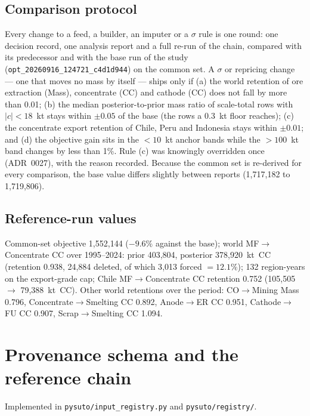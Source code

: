 \documentclass[11pt]{article}
\begin{document}
\subsection{Comparison protocol}
Every change to a feed, a builder, an imputer or a $\sigma$ rule is one
round: one decision record, one analysis report and a full re-run of the
chain, compared with its predecessor and with the base run of the study
(\texttt{opt\_20260916\_124721\_c4d1d944}) on the common set. A $\sigma$ or
repricing change --- one that moves no mass by itself --- ships only if
(a) the world retention of ore extraction (Mass), concentrate (CC) and
cathode (CC) does not fall by more than 0.01; (b) the median
posterior-to-prior mass ratio of scale-total rows with $|c| < 18$~kt stays
within $\pm 0.05$ of the base (the rows a 0.3~kt floor reaches); (c) the
concentrate export retention of Chile, Peru and Indonesia stays within
$\pm 0.01$; and (d) the objective gain sits in the $< 10$~kt anchor bands
while the $> 100$~kt band changes by less than 1\%. Rule (c) was knowingly
overridden once (ADR~0027), with the reason recorded. Because the common set
is re-derived for every comparison, the base value differs slightly between
reports (1{,}717{,}182 to 1{,}719{,}806).

\subsection{Reference-run values}
Common-set objective 1{,}552{,}144 ($-9.6\%$ against the base); world
MF$\to$Concentrate CC over 1995--2024: prior 403{,}804, posterior
378{,}920~kt~CC (retention 0.938, 24{,}884 deleted, of which 3{,}013 forced
$= 12.1\%$); 132 region-years on the export-grade cap; Chile MF$\to$Concentrate
CC retention 0.752 (105{,}505 $\to$ 79{,}388~kt~CC). Other world retentions
over the period: CO$\to$Mining Mass 0.796, Concentrate$\to$Smelting CC 0.892,
Anode$\to$ER CC 0.951, Cathode$\to$FU CC 0.907, Scrap$\to$Smelting CC 1.094.

\section{Provenance schema and the reference chain}\label{si:provenance}
Implemented in \texttt{pysuto/input\_registry.py} and \texttt{pysuto/registry/}.
\end{document}
